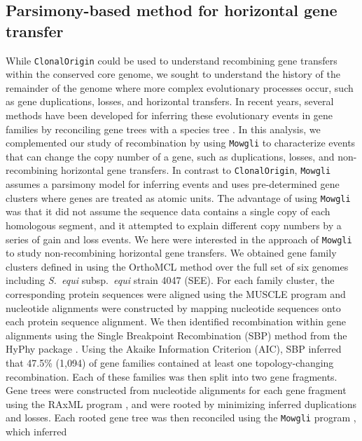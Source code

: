 \documentclass[english]{article}
\begin{document}
\subsection{Parsimony-based method for horizontal gene transfer}

While \texttt{ClonalOrigin} could be used to understand recombining gene
transfers within the conserved core genome, we sought to understand the history
of the remainder of the genome where more complex evolutionary processes occur,
such as gene duplications, losses, and horizontal transfers.  In recent years,
several methods have been developed for inferring these evolutionary events in
gene families by reconciling gene trees with a species tree
\citep{David2011,Doyon2011,Tofigh2011}.  In this analysis, we complemented our
study of recombination by using \texttt{Mowgli} \citep{Doyon2011} to
characterize events that can change the copy number of a gene, such as
duplications, losses, and non-recombining horizontal gene transfers.  In
contrast to \texttt{ClonalOrigin}, \texttt{Mowgli} assumes a parsimony model for
inferring events and uses pre-determined gene clusters where genes are treated
as atomic units.  The advantage of using \texttt{Mowgli} was that it did not
assume the sequence data contains a single copy of each homologous segment, and
it attempted to explain different copy numbers by a series of gain and loss
events.  We here were interested in the approach of \texttt{Mowgli} to study
non-recombining horizontal gene transfers.  We obtained gene family clusters
defined in \citet{Suzuki2011} using the OrthoMCL method \citep{Li2003} over the
full set of six genomes including \textit{S.\ equi} subsp.\textit{\ equi} strain
4047 (SEE).  For each family cluster, the corresponding protein sequences were
aligned using the MUSCLE program \citep{Edgar2004a} and nucleotide alignments
were constructed by mapping nucleotide sequences onto each protein sequence
alignment. We then identified recombination within gene alignments using the
Single Breakpoint Recombination (SBP) method from the HyPhy package
\citep{KosakovskyPond2006}.  Using the Akaike Information Criterion (AIC), SBP
inferred that 47.5\% (1,094) of gene families contained at least one
topology-changing recombination. Each of these families was then split into two
gene fragments.  Gene trees were constructed from nucleotide alignments for each
gene fragment using the RAxML program \citep{Stamatakis2006}, and were rooted by
minimizing inferred duplications and losses.  Each rooted gene tree was then
reconciled using the \texttt{Mowgli} program \citep{Doyon2011}, which inferred
\end{document}
